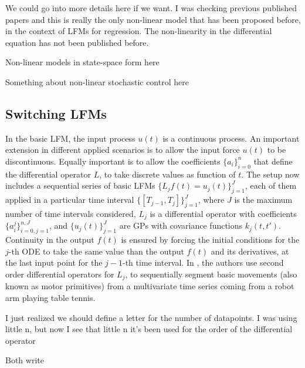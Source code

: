 \documentclass[journal]{IEEEtran}
\newcommand{\mauricio}[1]{{\color{blue}#1}}
\newcommand{\simo}[1]{{\color{red}#1}}
\begin{document}
\mauricio{We could go into more details here if we want. I was checking previous published papers and this is really
the only non-linear model that has been proposed before, in the context of LFMs for regression. The non-linearity in the
differential equation has not been published before}.


\simo{Non-linear models in state-space form here}

\simo{Something about non-linear stochastic control here}


\subsection{Switching LFMs}

In the basic LFM, the input process $u(t)$ is a continuous process. An important extension in different applied scenarios
is to allow the input force $u(t)$ to be discontinuous. Equally important is to allow the coefficients $\{a_i\}_{i=0}^n$ that
define the differential operator $L$, to take discrete values as function of $t$. The setup now includes a sequential
series of basic LFMs $\{L_jf(t) = u_j(t)\}_{j=1}^J$, each of them applied in a particular time interval
$\{[T_{j-1}, T_j]\}_{j=1}^J$, where $J$ is the maximum number of time intervals considered, $L_j$ is a differential operator
with coefficients $\{a_i^j\}_{i=0,j=1}^{n, J}$, and $\{u_j(t)\}_{j=1}^J$ are GPs with covariance functions $k_j(t,t')$.
Continuity in the output $f(t)$ is ensured by forcing the initial conditions for the $j$-th ODE to take the same value
than the output $f(t)$ and its derivatives, at the last input point for the $j-1$-th time interval.
In \cite{Alvarez:switched11}, the authors use second order differential operators for $L_j$, to sequentially segment
basic movements (also known as motor primitives) from a multivariate time series coming from a robot arm playing table
tennis.

\mauricio{I just realized we should define a letter for the number of datapoints. I was using little n, but now I see
that little n it's been used for the order of the differential operator}

\simo{Both write}
\end{document}
